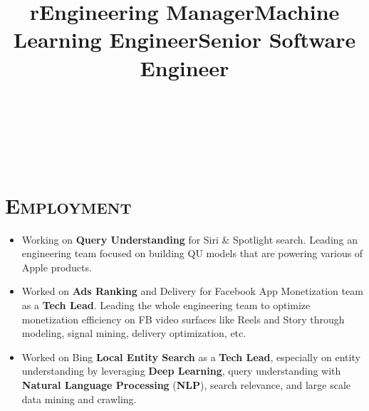 \begin{resume}

\begin{formatb}
  \title{r}\\
  \\
  \body\\
\end{formatb}

\vspace*{-16pt}
\section{\textsc{Employment}}

\title{Engineering Manager}
\begin{position}
\vspace*{-8pt}
\begin{itemize}
\item Working on \textbf{Query Understanding} for Siri \& Spotlight search. Leading an engineering team focused on building QU models that are powering various of Apple products.
\end{itemize} 
\end{position}

\title{Machine Learning Engineer}
\begin{position}
\vspace*{-8pt}
\begin{itemize}
\item Worked on \textbf{Ads Ranking} and Delivery for Facebook App Monetization team as a \textbf{Tech Lead}. Leading the whole engineering team to optimize monetization efficiency on FB video surfaces like Reels and Story through modeling, signal mining, delivery optimization, etc.
\end{itemize} 
\end{position}

\title{Senior Software Engineer}
\begin{position}
\vspace*{-8pt}
\begin{itemize}
\item Worked on Bing \textbf{Local Entity Search} as a \textbf{Tech Lead}, especially on entity understanding by leveraging \textbf{Deep Learning}, query understanding with \textbf{Natural Language Processing} (\textbf{NLP}), search relevance, and large scale data mining and crawling.
\end{itemize} 
\end{position}


\end{resume}

